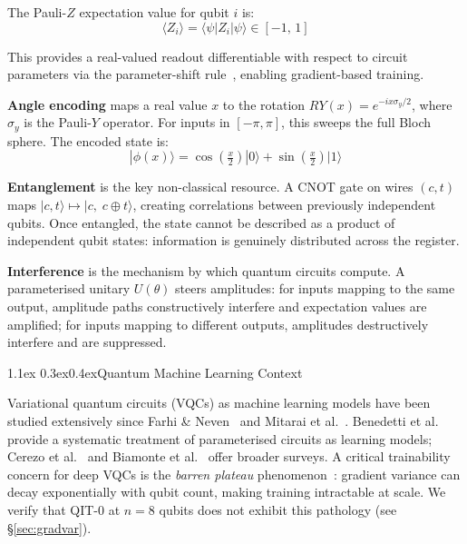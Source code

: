 \documentclass[11pt,a4paper]{article}
\makeatletter
\renewcommand\subsection{\@startsection{subsection}{2}{\z@}%
  {1.1ex \@plus 0.3ex}{0.4ex}{\normalfont\normalsize\bfseries}}
\newcommand{\ket}[1]{|{#1}\rangle}
\newcommand{\bra}[1]{\langle{#1}|}
\newcommand{\expected}[1]{\langle{#1}\rangle}
\makeatother
\begin{document}
The Pauli-$Z$ expectation value for qubit $i$ is:
\begin{equation}
  \expected{Z_i} = \bra{\psi} Z_i \ket{\psi} \in [-1,\,1]
  \label{eq:expval}
\end{equation}

This provides a real-valued readout differentiable with respect to circuit parameters via
the parameter-shift rule~\cite{schuld2019evaluating}, enabling gradient-based training.

\textbf{Angle encoding} maps a real value $x$ to the rotation
$RY(x) = e^{-i x \sigma_y / 2}$, where $\sigma_y$ is the Pauli-$Y$ operator.
For inputs in $[-\pi, \pi]$, this sweeps the full Bloch sphere. The encoded state is:
\begin{equation}
  \ket{\phi(x)} = \cos\!\left(\tfrac{x}{2}\right)\ket{0} + \sin\!\left(\tfrac{x}{2}\right)\ket{1}
  \label{eq:angle_enc}
\end{equation}

\textbf{Entanglement} is the key non-classical resource. A CNOT gate on wires $(c, t)$
maps $\ket{c, t} \mapsto \ket{c,\; c \oplus t}$, creating correlations between previously
independent qubits. Once entangled, the state cannot be described as a product of
independent qubit states: information is genuinely distributed across the register.

\textbf{Interference} is the mechanism by which quantum circuits compute. A
parameterised unitary $U(\theta)$ steers amplitudes: for inputs mapping to the same
output, amplitude paths constructively interfere and expectation values are amplified;
for inputs mapping to different outputs, amplitudes destructively interfere and are
suppressed.

\subsection{Quantum Machine Learning Context}

Variational quantum circuits (VQCs) as machine learning models have been studied
extensively since Farhi \& Neven~\cite{farhi2018classification} and
Mitarai et al.~\cite{mitarai2018quantum}. Benedetti et al.~\cite{benedetti2019parameterized}
provide a systematic treatment of parameterised circuits as learning models;
Cerezo et al.~\cite{cerezo2021variational} and Biamonte et al.~\cite{biamonte2017quantum}
offer broader surveys. A critical trainability concern for deep VQCs is the \emph{barren
plateau} phenomenon~\cite{mcclean2018barren}: gradient variance can decay exponentially
with qubit count, making training intractable at scale. We verify that QIT-0 at $n=8$
qubits does not exhibit this pathology (see \S\ref{sec:gradvar}).
\end{document}
